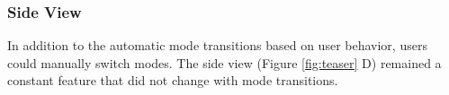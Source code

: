 


\subsubsection{Side View}
\label{side-view}

In addition to the automatic mode transitions based on user behavior, users could manually switch modes. The side view (Figure \ref{fig:teaser} D) remained a constant feature that did not change with mode transitions. 

